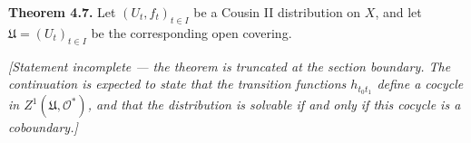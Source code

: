 \textbf{Theorem 4.7.} Let $(U_t, f_t)_{t \in I}$ be a Cousin II
distribution on $X$, and let $\mathfrak{U} = (U_t)_{t \in I}$ be the
corresponding open covering.

\textit{[Statement incomplete --- the theorem is truncated at the section
boundary. The continuation is expected to state that the transition functions
$h_{t_0 t_1}$ define a cocycle in $Z^1(\mathfrak{U}, \mathcal{O}^*)$, and that
the distribution is solvable if and only if this cocycle is a coboundary.]}
